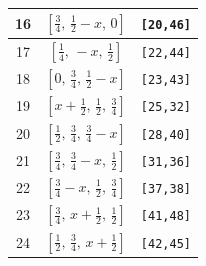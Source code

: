 \documentclass[fleqn,8pt]{jsarticle}
\begin{document}
\begin{longtable}{ccc}
16 & $\left[ \frac{3}{4},\, \frac{1}{2} - x,\, 0 \right]$ & {\tt [20,46]} \\ \hline
17 & $\left[ \frac{1}{4},\, - x,\, \frac{1}{2} \right]$ & {\tt [22,44]} \\ \hline
18 & $\left[ 0,\, \frac{3}{4},\, \frac{1}{2} - x \right]$ & {\tt [23,43]} \\ \hline
19 & $\left[ x + \frac{1}{2},\, \frac{1}{2},\, \frac{3}{4} \right]$ & {\tt [25,32]} \\ \hline
20 & $\left[ \frac{1}{2},\, \frac{3}{4},\, \frac{3}{4} - x \right]$ & {\tt [28,40]} \\ \hline
21 & $\left[ \frac{3}{4},\, \frac{3}{4} - x,\, \frac{1}{2} \right]$ & {\tt [31,36]} \\ \hline
22 & $\left[ \frac{3}{4} - x,\, \frac{1}{2},\, \frac{3}{4} \right]$ & {\tt [37,38]} \\ \hline
23 & $\left[ \frac{3}{4},\, x + \frac{1}{2},\, \frac{1}{2} \right]$ & {\tt [41,48]} \\ \hline
24 & $\left[ \frac{1}{2},\, \frac{3}{4},\, x + \frac{1}{2} \right]$ & {\tt [42,45]} \\
\end{longtable}
\renewcommand{\arraystretch}{1.2}
\end{document}
